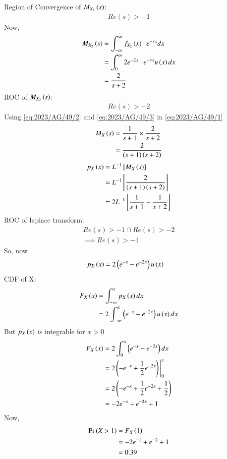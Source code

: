 \documentclass[journal,12pt,twocolumn]{IEEEtran}
\theoremstyle{remark}
\begin{document}
Region of Convergence of $M_{X_1}\left(s\right)$:
\begin{align}
Re(s) > -1
\end{align}
Now,
\begin{align}
M_{X_2}\left(s\right) &= \int_{-\infty}^{\infty} f_{X_2}\left(x\right)\cdot e^{-sx}dx\\
&=\int_{0}^{\infty} 2e^{-2x}\cdot e^{-sx}u\left(x\right)dx\\
&= \frac{2}{s+2}\label{eq:2023/AG/49/3}
\end{align}
ROC of $M_{X_2}\left(s\right)$:
\begin{align}
Re(s) > -2
\end{align}
Using \eqref{eq:2023/AG/49/2} and \eqref{eq:2023/AG/49/3} in \eqref{eq:2023/AG/49/1}
\begin{align}
M_X\left(s\right) &= \frac{1}{s+1} \times \frac{2}{s+2}\\
&= \frac{2}{\left(s+1\right)\left(s+2\right)}
\end{align}
\begin{align}
p_X\left(x\right) &= L^{-1}{}\left[M_X\left(s\right)\right]\\
&= L^{-1}{}\left[\frac{2}{\left(s+1\right)\left(s+2\right)}\right]\\
&= 2L^{-1}{}\left[\frac{1}{s+1}-\frac{1}{s+2}\right]
\end{align}
ROC of laplace transform:
\begin{align}
Re(s)>-1 \cap Re(s)>-2\\
\implies Re(s)>-1 
\end{align}
So, now 
\begin{align}
p_X\left(x\right) &= 2\left(e^{-x}-e^{-2x}\right)u\left(x\right)
\end{align}
CDF of X:
\begin{align}
F_{X}\left(x\right) &= \int_{-\infty}^{x} p_X\left(x\right)dx\\
&= 2\int_{-\infty}^{x}\left(e^{-x}-e^{-2x}\right)u\left(x\right)dx
\end{align}
But $p_X\left(x\right)$ is integrable for $x>0$
\begin{align}
F_{X}\left(x\right) &= 2\int_{0}^{x} \left(e^{-x}-e^{-2x}\right)dx\\
&= 2\left(-e^{-x}+\frac{1}{2}e^{-2x}\right)\Bigg|_{0}^{x}\\
&= 2\left(-e^{-x}+\frac{1}{2}e^{-2x}+\frac{1}{2}\right)\\
&= -2e^{-x}+e^{-2x}+1
\end{align}
Now,
\begin{align}
\Pr\left(X>1\right)&= F_{X}\left(1\right)\\
&= -2e^{-1}+e^{-2}+1\\
&= 0.39
\end{align}
\end{document}
